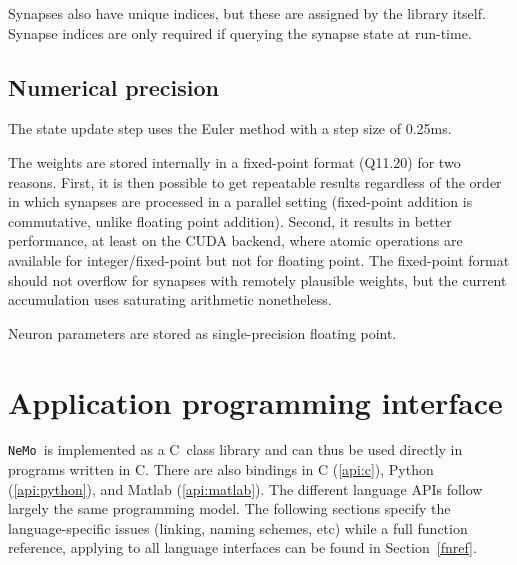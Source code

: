 \documentclass[a4paper]{article}
\newcommand{\nemo}{\texttt{NeMo}}
\newcommand{\cpp}{C\nolinebreak\hspace{-.05em}\raisebox{.4ex}{\tiny\bf +}\nolinebreak\hspace{-.10em}\raisebox{.4ex}{\tiny\bf +}}
\begin{document}
Synapses also have unique indices, but these are assigned by the library itself.
Synapse indices are only required if querying the synapse state at run-time.

\subsection{Numerical precision}

The state update step uses the Euler method with a step size of 0.25ms. 

The weights are stored internally in a fixed-point format (Q11.20) for two reasons.
First,
	it is then possible to get repeatable results regardless of the order in which synapses are processed in a parallel setting (fixed-point addition is commutative, unlike floating point addition).
Second, 
	it results in better performance, at least on the CUDA backend, where atomic operations are available for integer/fixed-point but not for floating point. 
The fixed-point format should not overflow for synapses with remotely plausible weights,
	but the current accumulation uses saturating arithmetic nonetheless.

Neuron parameters are stored as single-precision floating point.






% 

\section{Application programming interface}
\label{api}

\nemo\ is implemented as a \cpp\ class library and can thus be used directly in programs written in \cpp.
There are also bindings in
	C (\ref{api:c}),
	Python (\ref{api:python}),
	and Matlab (\ref{api:matlab}).
The different language APIs follow largely the same programming model.
The following sections specify the language-specific issues
	(linking, naming schemes, etc)
	while a full function reference, applying to all language interfaces can be found in Section~\ref{fnref}.
\end{document}

